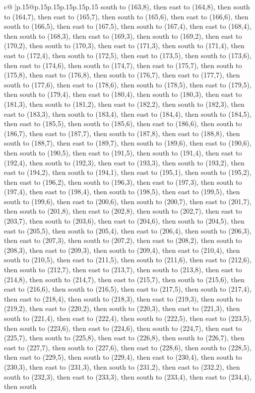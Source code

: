 \documentclass{article}
\begin{document}
{\begin{supertabular}{c@{$\;$}|p{.15\linewidth}@{}p{.15\linewidth}p{.15\linewidth}p{.15\linewidth}p{.15\linewidth}p{.15\linewidth}}
{{{south to (163,8), then east to (164,8), then south to (164,7), then east to (165,7), then south to (165,6), then east to (166,6), then south to (166,5), then east to (167,5), then south to (167,4), then east to (168,4), then south to (168,3), then east to (169,3), then south to (169,2), then east to (170,2), then south to (170,3), then east to (171,3), then south to (171,4), then east to (172,4), then south to (172,5), then east to (173,5), then south to (173,6), then east to (174,6), then south to (174,7), then east to (175,7), then south to (175,8), then east to (176,8), then south to (176,7), then east to (177,7), then south to (177,6), then east to (178,6), then south to (178,5), then east to (179,5), then south to (179,4), then east to (180,4), then south to (180,3), then east to (181,3), then south to (181,2), then east to (182,2), then south to (182,3), then east to (183,3), then south to (183,4), then east to (184,4), then south to (184,5), then east to (185,5), then south to (185,6), then east to (186,6), then south to (186,7), then east to (187,7), then south to (187,8), then east to (188,8), then south to (188,7), then east to (189,7), then south to (189,6), then east to (190,6), then south to (190,5), then east to (191,5), then south to (191,4), then east to (192,4), then south to (192,3), then east to (193,3), then south to (193,2), then east to (194,2), then south to (194,1), then east to (195,1), then south to (195,2), then east to (196,2), then south to (196,3), then east to (197,3), then south to (197,4), then east to (198,4), then south to (198,5), then east to (199,5), then south to (199,6), then east to (200,6), then south to (200,7), then east to (201,7), then south to (201,8), then east to (202,8), then south to (202,7), then east to (203,7), then south to (203,6), then east to (204,6), then south to (204,5), then east to (205,5), then south to (205,4), then east to (206,4), then south to (206,3), then east to (207,3), then south to (207,2), then east to (208,2), then south to (208,3), then east to (209,3), then south to (209,4), then east to (210,4), then south to (210,5), then east to (211,5), then south to (211,6), then east to (212,6), then south to (212,7), then east to (213,7), then south to (213,8), then east to (214,8), then south to (214,7), then east to (215,7), then south to (215,6), then east to (216,6), then south to (216,5), then east to (217,5), then south to (217,4), then east to (218,4), then south to (218,3), then east to (219,3), then south to (219,2), then east to (220,2), then south to (220,3), then east to (221,3), then south to (221,4), then east to (222,4), then south to (222,5), then east to (223,5), then south to (223,6), then east to (224,6), then south to (224,7), then east to (225,7), then south to (225,8), then east to (226,8), then south to (226,7), then east to (227,7), then south to (227,6), then east to (228,6), then south to (228,5), then east to (229,5), then south to (229,4), then east to (230,4), then south to (230,3), then east to (231,3), then south to (231,2), then east to (232,2), then south to (232,3), then east to (233,3), then south to (233,4), then east to (234,4), then south }}}
\end{supertabular}}
\end{document}
